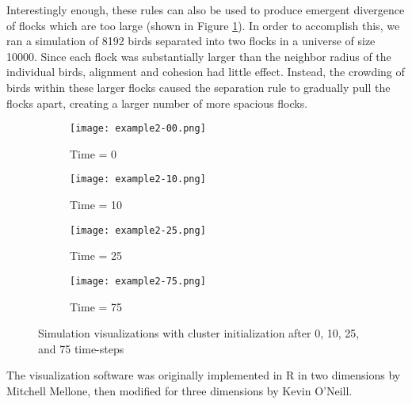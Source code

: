 Interestingly enough, these rules can also be used to produce emergent
divergence of flocks which are too large (shown in Figure
\ref{fig:visuals2}). In order to accomplish this, we ran a simulation
of 8192 birds separated into two flocks in a universe of size
10000. Since each flock was substantially larger than the neighbor
radius of the individual birds, alignment and cohesion had little
effect. Instead, the crowding of birds within these larger flocks
caused the separation rule to gradually pull the flocks apart,
creating a larger number of more spacious flocks.

\begin{figure}[h!]
  \centering
  \begin{subfigure}{0.24\textwidth}
    \centering
    \texttt{[image: example2-00.png]}
    \caption{Time = 0}
  \end{subfigure}
  \begin{subfigure}{0.24\textwidth}
    \centering
    \texttt{[image: example2-10.png]}
    \caption{Time = 10}
  \end{subfigure}
  \begin{subfigure}{0.24\textwidth}
    \centering
    \texttt{[image: example2-25.png]}
    \caption{Time = 25}
  \end{subfigure}
  \begin{subfigure}{0.24\textwidth}
    \centering
    \texttt{[image: example2-75.png]}
    \caption{Time = 75}
  \end{subfigure}
  
  \caption{Simulation visualizations with cluster initialization after
    0, 10, 25, and 75 time-steps}
  \label{fig:visuals2}
\end{figure}

The visualization software was originally implemented in R in two
dimensions by Mitchell Mellone, then modified for three dimensions by
Kevin O'Neill.
